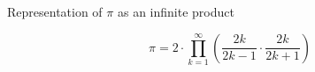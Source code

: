 \documentclass{article}
\begin{document}
\begin{Q}
  Representation of $\pi$ as an infinite product
\end{Q}

\begin{A}
  
\end{A}

\[
\pi = 2\cdot\prod_{k=1}^\infty \left( \frac{2k}{2k-1} \cdot \frac{2k}{2k+1} \right)
\]
\end{document}
